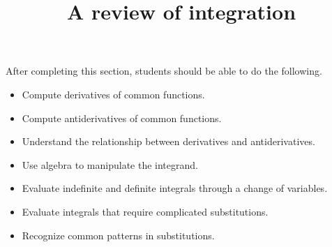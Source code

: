 \documentclass{ximera}
\title{A review of integration}
\begin{document}
\begin{abstract}
\end{abstract}

\maketitle

\begin{sectionOutcomes}

After completing this section, students should be able to do the following.

\begin{itemize}
\item Compute derivatives of common functions.
\item Compute antiderivatives of common functions.
\item Understand the relationship between derivatives and antiderivatives.
\item Use algebra to manipulate the integrand.
\item Evaluate indefinite and definite integrals through a change of variables.
\item Evaluate integrals that require complicated substitutions.
\item Recognize common patterns in substitutions.

\end{itemize}

\end{sectionOutcomes}
\end{document}
